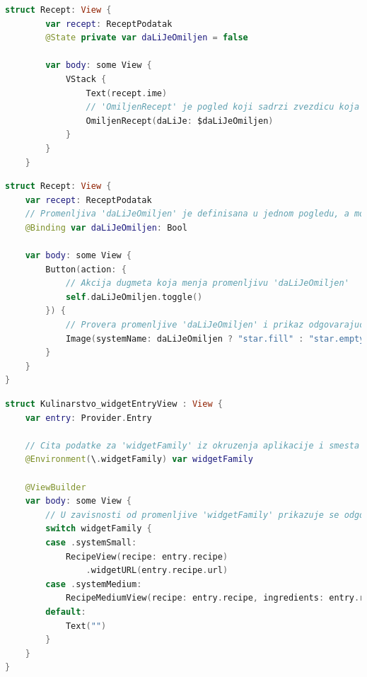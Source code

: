 \documentclass[12pt,oneside]{memoir}
\begin{document}
\begin{lstlisting}[caption=\textit{{Омотачи података - State}}, label={lst:Омотачи података - State}, language=Swift, frame=single]
    struct Recept: View {
        var recept: ReceptPodatak
        @State private var daLiJeOmiljen = false
        
        var body: some View {
            VStack {
                Text(recept.ime)
                // 'OmiljenRecept' je pogled koji sadrzi zvezdicu koja oznacava da li je recept medju omiljenima (puna zvezdica - jeste, prazna - nije)
                OmiljenRecept(daLiJe: $daLiJeOmiljen)
            }
        }
    }
\end{lstlisting}

\begin{lstlisting}[caption=\textit{{Омотачи података - Binding}}, label={lst:Омотачи података - Binding}, language=Swift, frame=single]
    struct Recept: View {
    var recept: ReceptPodatak
    // Promenljiva 'daLiJeOmiljen' je definisana u jednom pogledu, a moze se menjati u drugom
    @Binding var daLiJeOmiljen: Bool

    var body: some View {
        Button(action: {
            // Akcija dugmeta koja menja promenljivu 'daLiJeOmiljen'
            self.daLiJeOmiljen.toggle()
        }) {
            // Provera promenljive 'daLiJeOmiljen' i prikaz odgovarajuce slike
            Image(systemName: daLiJeOmiljen ? "star.fill" : "star.empty")
        }
    }
}
\end{lstlisting}

\begin{lstlisting}[caption=\textit{{Омотачи података - Environment}}, label={lst:Омотачи података - Environment}, language=Swift, frame=single]
    struct Kulinarstvo_widgetEntryView : View {
    var entry: Provider.Entry
    
    // Cita podatke za 'widgetFamily' iz okruzenja aplikacije i smesta ih u promenljivu 'widgetFamily'
    @Environment(\.widgetFamily) var widgetFamily
    
    @ViewBuilder
    var body: some View {
        // U zavisnosti od promenljive 'widgetFamily' prikazuje se odgovarajuci widget
        switch widgetFamily {
        case .systemSmall:
            RecipeView(recipe: entry.recipe)
                .widgetURL(entry.recipe.url)
        case .systemMedium:
            RecipeMediumView(recipe: entry.recipe, ingredients: entry.recipe.ingredients.count > 3 ? Array(entry.recipe.ingredients.dropLast(entry.recipe.ingredients.count - 3)) : entry.recipe.ingredients)
        default:
            Text("")
        }
    }
}
\end{lstlisting}
\end{document}
